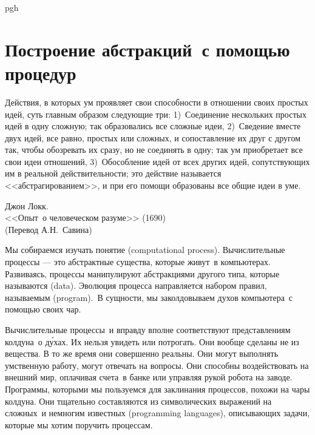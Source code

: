 pgh
\chapter{Построение абстракций~с помощью процедур}
\label{BUILDING-ABSTRACTIONS-WITH-PROCEDURES}
\thispagestyle{empty}

\epigraph{
Действия, в которых ум проявляет свои способности в отношении
своих простых идей, суть главным образом следующие три: 1)~Соединение
нескольких простых идей в одну сложную; так образовались все сложные
идеи,  2)~Сведение вместе двух идей, все равно, простых или сложных, и
сопоставление их друг с другом так, чтобы обозревать их сразу, но не
соединять в одну; так ум приобретает все свои идеи отношений, 3)~Обособление 
идей от всех других идей, сопутствующих им в реальной
действительности; это действие называется <<абстрагированием>>, и при
его помощи образованы все общие идеи в уме.
%
%
}%
{Джон Локк. \\
<<Опыт~о человеческом разуме>> (1690) \\ %
(Перевод А.Н.~Савина)}

Мы собираемся изучать понятие
%
 (com\-pu\-ta\-ti\-o\-nal process).
Вычислительные процессы --- это абстрактные
существа, которые живут~в компьютерах.  Развиваясь, процессы
манипулируют абстракциями другого типа, которые называются
 (data). Эволюция процесса направляется набором
правил, называемым  (program).~В сущности, мы
заколдовываем духов компьютера~с помощью своих чар.


Вычислительные процессы~и вправду вполне соответствуют представлениям
колдуна~о д\'ухах.  Их нельзя увидеть или
потрогать.  Они вообще сделаны не из вещества. В то же время они
совершенно реальны.  Они могут выполнять умственную работу, могут
отвечать на вопросы. Они способны воздействовать на внешний мир,
оплачивая счета~в банке или управляя рукой робота на заводе.
Программы, которыми мы пользуемся для заклинания процессов, похожи
на чары колдуна.  Они тщательно составляются из символических
выражений на сложных~и немногим известных  (programming languages), описывающих задачи, которые мы хотим
поручить процессам.

